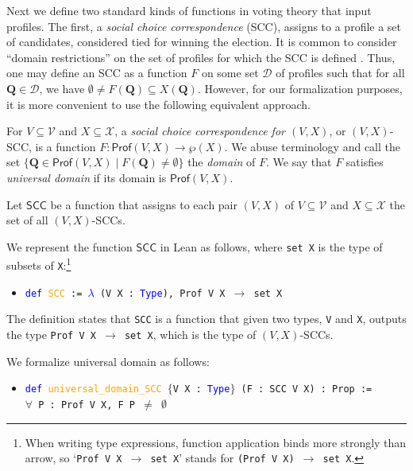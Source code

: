 \documentclass[runningheads]{llncs}
\begin{document}
Next we define two standard kinds of functions in voting theory that input profiles. The first, a \textit{social choice correspondence} (SCC), assigns to a profile a set of candidates, considered tied for winning the election. It is common to consider ``domain restrictions'' on the set of profiles for which the SCC is defined \cite{Gaertner2001}. Thus, one may define an SCC as a function $F$ on some set $\mathcal{D}$ of profiles such that for all $\mathbf{Q}\in\mathcal{D}$, we have ${\emptyset\neq F(\mathbf{Q})\subseteq X(\mathbf{Q})}$. However, for our formalization purposes, it is more convenient to use the following equivalent approach.

\begin{definition} \textnormal{For $V\subseteq\mathcal{V}$ and $X\subseteq\mathcal{X}$, a \textit{social choice correspondence for $(V,X)$}, or $(V,X)$-SCC, is a function  $F: \mathsf{Prof}(V,X)\to \wp(X)$. We abuse terminology and call the set $\{\mathbf{Q}\in\mathsf{Prof}(V,X)\mid F(\mathbf{Q})\neq\emptyset \}$ the \textit{domain} of $F$. We say that $F$ satisfies \textit{universal domain} if its domain is $\mathsf{Prof}(V,X)$.}

\textnormal{Let $\mathsf{SCC}$ be a function that assigns to each pair $(V,X)$ of $V\subseteq\mathcal{V}$ and $X\subseteq\mathcal{X}$ the set of all $(V,X)$-SCCs.}
\end{definition}

We represent the function $\mathsf{SCC}$ in Lean as follows, where \texttt{set X} is the type of subsets of \texttt{X}:\footnote{When writing type expressions, function application binds more strongly than arrow, so `\texttt{Prof V X $\to$ set X}' stands for \texttt{(Prof V X) $\to$ set X}.}
\begin{itemize}
\item[] \texttt{\textcolor{blue}{def} \textcolor{orange}{SCC} := \textcolor{blue}{$\lambda$} (V X : \textcolor{blue}{Type}), Prof V X $\to$ set X}
\end{itemize}
The definition states that \texttt{SCC} is a function that given two types, \texttt{V} and \texttt{X}, outputs the type \texttt{Prof V X $\to$ set X}, which is the type of $(V,X)$-SCCs. 

We formalize universal domain as follows:
\begin{itemize}
\item[] \texttt{\textcolor{blue}{def} \textcolor{orange}{universal\_domain\_SCC} $\{$V X : \textcolor{blue}{Type}$\}$ (F : SCC V X) : Prop :=} \\
\texttt{$\forall$ P : Prof V X, F P $\neq$ $\emptyset$}
\end{itemize}
\end{document}
